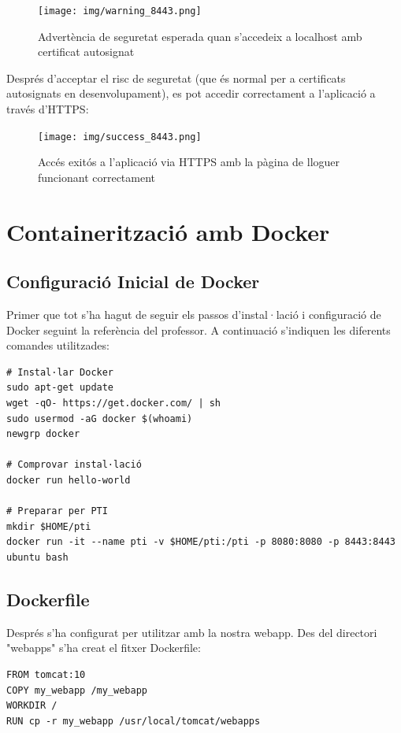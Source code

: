 \documentclass[12pt,a4paper]{article}
\begin{document}
\begin{figure}[H]
\centering
\texttt{[image: img/warning\_8443.png]}
\caption{Advertència de seguretat esperada quan s'accedeix a localhost amb certificat autosignat}
\end{figure}

Després d'acceptar el risc de seguretat (que és normal per a certificats autosignats en desenvolupament), es pot accedir correctament a l'aplicació a través d'HTTPS:

\begin{figure}[H]
\centering
\texttt{[image: img/success\_8443.png]}
\caption{Accés exitós a l'aplicació via HTTPS amb la pàgina de lloguer funcionant correctament}
\end{figure}

\section{Containerització amb Docker}

\subsection{Configuració Inicial de Docker}

Primer que tot s'ha hagut de seguir els passos d'instal·lació i configuració de Docker seguint la referència del professor. A continuació s'indiquen les diferents comandes utilitzades:

\begin{lstlisting}[style=shellstyle,caption=Instal·lació de Docker]
# Instal·lar Docker
sudo apt-get update
wget -qO- https://get.docker.com/ | sh
sudo usermod -aG docker $(whoami)
newgrp docker

# Comprovar instal·lació
docker run hello-world

# Preparar per PTI
mkdir $HOME/pti
docker run -it --name pti -v $HOME/pti:/pti -p 8080:8080 -p 8443:8443 ubuntu bash
\end{lstlisting}

\subsection{Dockerfile}

Després s'ha configurat per utilitzar amb la nostra webapp. Des del directori "webapps" s'ha creat el fitxer Dockerfile:

\begin{lstlisting}[language=Docker,caption=Dockerfile per a l'aplicació]
FROM tomcat:10
COPY my_webapp /my_webapp
WORKDIR /
RUN cp -r my_webapp /usr/local/tomcat/webapps
\end{lstlisting}
\end{document}
